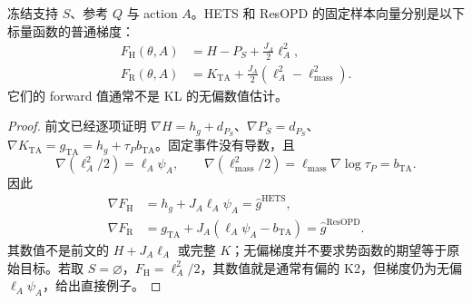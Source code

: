 \documentclass[lang=cn,scheme=chinese,openany]{../book/elegantbook}
\begin{document}
\begin{proposition}
\label{est:sample-potentials}
冻结支持 $S$、参考 $Q$ 与 action $A$。HETS 和 ResOPD 的固定样本向量分别是以下标量函数的普通梯度：
\begin{align}
F_{\mathrm H}(\theta,A)&=H-P_S+\frac{J_A}{2}\ell_A^2,\\
F_{\mathrm R}(\theta,A)&=K_{\mathrm{TA}}+\frac{J_A}{2}(\ell_A^2-\ell_{\mathrm{mass}}^2).
\end{align}
它们的 forward 值通常不是 KL 的无偏数值估计。
\end{proposition}
\begin{proof}
前文已经逐项证明 $\nabla H=h_g+d_{P_S}$、$\nabla P_S=d_{P_S}$、$\nabla K_{\mathrm{TA}}=g_{\mathrm{TA}}=h_g+\tau_Pb_{\mathrm{TA}}$。固定事件没有导数，且
\begin{equation}
\nabla(\ell_A^2/2)=\ell_A\psi_A,\qquad
\nabla(\ell_{\mathrm{mass}}^2/2)
=\ell_{\mathrm{mass}}\nabla\log\tau_P=b_{\mathrm{TA}}.
\end{equation}
因此
\begin{align}
\nabla F_{\mathrm H}&=h_g+J_A\ell_A\psi_A=\widehat g^{\mathrm{HETS}},\\
\nabla F_{\mathrm R}&=g_{\mathrm{TA}}+J_A(\ell_A\psi_A-b_{\mathrm{TA}})=\widehat g^{\mathrm{ResOPD}}.
\end{align}
其数值不是前文的 $H+J_A\ell_A$ 或完整 $K$；无偏梯度并不要求势函数的期望等于原始目标。若取 $S=\varnothing$，$F_{\mathrm H}=\ell_A^2/2$，其数值就是通常有偏的 K2，但梯度仍为无偏 $\ell_A\psi_A$，给出直接例子。
\end{proof}
\end{document}
